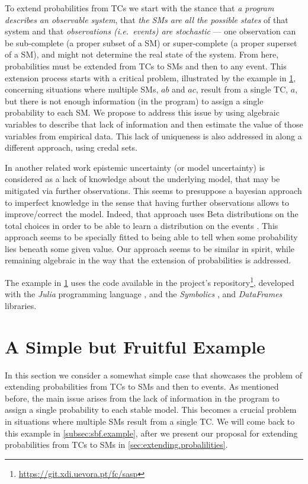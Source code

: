 \documentclass{llncs}
\renewcommand{\remark}[2]{%
    \stepcounter{remark}%
    \!{\color{red}/\!}%
    #1%
    {\!\color{red}/}\footnotemark[\arabic{remark}]%
    \footnotetext[\arabic{remark}]{{\color{red}/}#2}%
    }
\renewcommand{\note}[1]{
    \stepcounter{remark}%
    {\!\!\color{red}/}\footnotemark[\arabic{remark}]\!\!%
    \footnotetext[\arabic{remark}]{{\color{red}/}#1}
}
\begin{document}
To extend probabilities from \aclp{TC} we start with the stance that \emph{a program describes an observable system}, that \emph{the \aclp{SM} are all the possible states} of that system and that \emph{observations (i.e.\ events) are stochastic} --- one observation can be sub-complete (a proper subset of a \ac{SM}) or super-complete (a proper superset of a \ac{SM}),
 and might not determine the real state of the system. From here, probabilities must be extended from \acp{TC} to \acp{SM} and then to any event.
%
This extension process starts with a critical problem, illustrated by the  example in \cref{sec:example.1}, concerning situations where multiple \acp{SM}, $ab$ and $ac$, result from a single \ac{TC}, $a$, but there is not enough information (in the program) to assign a single probability to each \ac{SM}. We propose to address this issue by using algebraic variables to describe that lack of information and then estimate the value of those variables from empirical data. This lack of uniqueness is also addressed in \cite{cozman2020joy} along a different approach, using credal sets.

In another related work \cite{verreet2022inference} epistemic uncertainty (or model uncertainty) is considered as a lack of knowledge about the underlying model, that may be mi\-ti\-ga\-ted via further observations. This seems to presuppose a bayesian approach to imperfect knowledge in the sense that having further observations allows to improve/correct the model. Indeed, that approach uses Beta distributions on the total choices in order to be able to learn a distribution on the events
. This approach seems to be specially fitted to being able to tell when some probability lies beneath some given value. Our approach seems to be similar in spirit, while remaining algebraic in the way that the extension of probabilities is addressed.

The example in \cref{sec:example.1} uses the code available in the project's repository\footnote{\url{https://git.xdi.uevora.pt/fc/sasp}}, developed with the \textit{Julia} programming language \cite{bezanson2017julia}, and the \textit{Symbolics} \cite{gowda2021high}, and \textit{DataFrames} \cite{bouchetvalat2023dataframes} libraries.
%
%
%
\section{A Simple but Fruitful Example}\label{sec:example.1}
%
%
%
In this section we consider a somewhat simple case that showcases the problem of extending probabilities from \aclp{TC} to \aclp{SM} and then to events. As mentioned before, the main issue arises from the lack of information in the program to assign a single probability to each stable model. This becomes a crucial problem in situations where multiple \aclp{SM} result from a single \acl{TC}. We will come back to this example in \cref{subsec:sbf.example}, after we present our proposal for extending probabilities from \aclp{TC} to \aclp{SM} in \cref{sec:extending.probalilities}.
\end{document}
